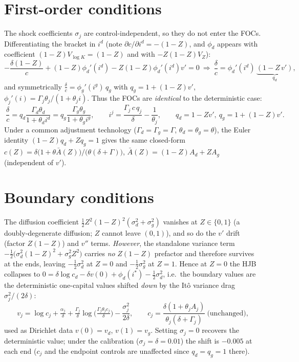 \documentclass[11pt]{article}
\begin{document}
\section{First-order conditions}

The shock coefficients $\sigma_j$ are control-independent, so they do not enter the
FOCs. Differentiating the bracket in $i^d$ (note $\partial c/\partial i^d=-(1-Z)$,
and $\phi_d$ appears with coefficient $(1-Z)V_{\log K}=(1-Z)$ and with
$-Z(1-Z)V_Z$):
\[
-\frac{\delta(1-Z)}{c}+(1-Z)\phi_d'(i^d)-Z(1-Z)\phi_d'(i^d)v'=0
\ \Longrightarrow\ \frac{\delta}{c}=\phi_d'(i^d)\,\underbrace{(1-Z\,v')}_{q_d},
\]
and symmetrically $\tfrac{\delta}{c}=\phi_g'(i^g)\,q_g$ with $q_g=1+(1-Z)v'$,
$\phi_j'(i)=\Gamma_j\theta_j/(1+\theta_j i)$. Thus the FOCs are \emph{identical} to
the deterministic case:
\[
\boxed{\ \frac{\delta}{c}=q_d\frac{\Gamma_d\theta_d}{1+\theta_d i^d}
=q_g\frac{\Gamma_g\theta_g}{1+\theta_g i^g},\qquad
i^j=\frac{\Gamma_j\,c\,q_j}{\delta}-\frac1{\theta_j},\qquad
q_d=1-Zv',\ q_g=1+(1-Z)v'.\ }
\]
Under a common adjustment technology ($\Gamma_d=\Gamma_g=\Gamma$,
$\theta_d=\theta_g=\theta$), the Euler identity $(1-Z)q_d+Zq_g=1$ gives the same
closed-form $c(Z)=\delta\big(1+\theta\bar A(Z)\big)/\big(\theta(\delta+\Gamma)\big)$,
$\bar A(Z)=(1-Z)A_d+ZA_g$ (independent of $v'$).

\section{Boundary conditions}

The diffusion coefficient $\tfrac12Z^2(1-Z)^2(\sigma_d^2+\sigma_g^2)$ vanishes at
$Z\in\{0,1\}$ (a doubly-degenerate diffusion; $Z$ cannot leave $(0,1)$), and so do
the $v'$ drift (factor $Z(1-Z)$) and $v''$ terms. \emph{However}, the standalone
variance term $-\tfrac12\big(\sigma_d^2(1-Z)^2+\sigma_g^2Z^2\big)$ carries \emph{no}
$Z(1-Z)$ prefactor and therefore survives at the ends, leaving $-\tfrac12\sigma_d^2$
at $Z=0$ and $-\tfrac12\sigma_g^2$ at $Z=1$. Hence at $Z=0$ the HJB collapses to
$0=\delta\log c_d-\delta v(0)+\phi_d(i^\ast)-\tfrac12\sigma_d^2$, i.e.\ the boundary
values are the deterministic one-capital values shifted \emph{down} by the It\^o
variance drag $\sigma_j^2/(2\delta)$:
\[
v_j=\log c_j+\tfrac{\alpha_j}{\delta}
+\tfrac{\Gamma_j}{\delta}\log\!\Big(\tfrac{\Gamma_j\theta_j c_j}{\delta}\Big)
-\frac{\sigma_j^2}{2\delta},
\qquad
c_j=\frac{\delta(1+\theta_j A_j)}{\theta_j(\delta+\Gamma_j)}\ \text{(unchanged)},
\]
used as Dirichlet data $v(0)=v_d$, $v(1)=v_g$. Setting $\sigma_j=0$ recovers the
deterministic value; under the calibration ($\sigma_j=\delta=0.01$) the shift is
$-0.005$ at each end ($c_j$ and the endpoint controls are unaffected since
$q_d=q_g=1$ there).
\end{document}
